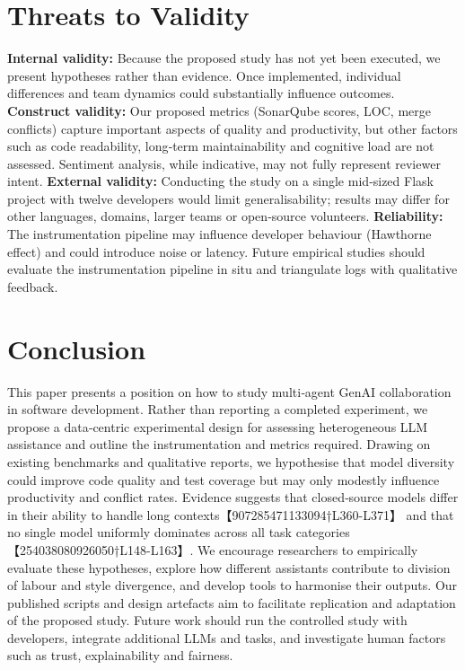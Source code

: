 \documentclass[conference]{IEEEtran}
\begin{document}
\section{Threats to Validity}
\textbf{Internal validity:} Because the proposed study has not yet been executed, we present hypotheses rather than evidence.  Once implemented, individual differences and team dynamics could substantially influence outcomes.  \textbf{Construct validity:} Our proposed metrics (SonarQube scores, LOC, merge conflicts) capture important aspects of quality and productivity, but other factors such as code readability, long‑term maintainability and cognitive load are not assessed.  Sentiment analysis, while indicative, may not fully represent reviewer intent.  \textbf{External validity:} Conducting the study on a single mid‑sized Flask project with twelve developers would limit generalisability; results may differ for other languages, domains, larger teams or open‑source volunteers.  \textbf{Reliability:} The instrumentation pipeline may influence developer behaviour (Hawthorne effect) and could introduce noise or latency.  Future empirical studies should evaluate the instrumentation pipeline in situ and triangulate logs with qualitative feedback.

\section{Conclusion}
This paper presents a position on how to study multi‑agent GenAI collaboration in software development.  Rather than reporting a completed experiment, we propose a data‑centric experimental design for assessing heterogeneous LLM assistance and outline the instrumentation and metrics required.  Drawing on existing benchmarks and qualitative reports, we hypothesise that model diversity could improve code quality and test coverage but may only modestly influence productivity and conflict rates.  Evidence suggests that closed‑source models differ in their ability to handle long contexts【907285471133094†L360-L371】 and that no single model uniformly dominates across all task categories【254038080926050†L148-L163】.  We encourage researchers to empirically evaluate these hypotheses, explore how different assistants contribute to division of labour and style divergence, and develop tools to harmonise their outputs.  Our published scripts and design artefacts aim to facilitate replication and adaptation of the proposed study.  Future work should run the controlled study with developers, integrate additional LLMs and tasks, and investigate human factors such as trust, explainability and fairness.
\end{document}
